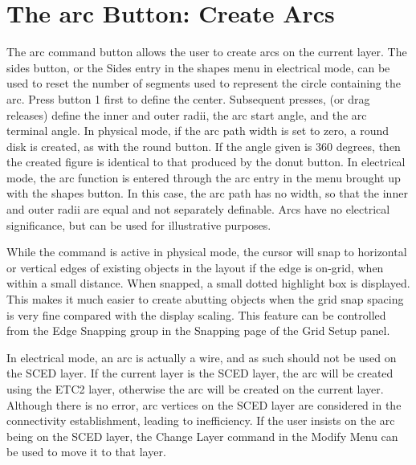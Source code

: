 \newpage

\section{The {\cb arc} Button: Create Arcs}

The {\cb arc} command button allows the user to create arcs on the
current layer.  The {\cb sides} button, or the {\cb Sides} entry in
the {\cb shapes} menu in electrical mode, can be used to reset the
number of segments used to represent the circle containing the arc. 
Press button 1 first to define the center.  Subsequent presses, (or
drag releases) define the inner and outer radii, the arc start angle,
and the arc terminal angle.  In physical mode, if the arc path width
is set to zero, a round disk is created, as with the {\cb round}
button.  If the angle given is 360 degrees, then the created figure is
identical to that produced by the {\cb donut} button.  In electrical
mode, the arc function is entered through the {\cb arc} entry in the
menu brought up with the {\cb shapes} button.  In this case, the arc
path has no width, so that the inner and outer radii are equal and not
separately definable.  Arcs have no electrical significance, but can
be used for illustrative purposes.

While the command is active in physical mode, the cursor will snap to
horizontal or vertical edges of existing objects in the layout if the
edge is on-grid, when within a small distance.  When snapped, a small
dotted highlight box is displayed.  This makes it much easier to
create abutting objects when the grid snap spacing is very fine
compared with the display scaling.  This feature can be controlled
from the {\cb Edge Snapping} group in the {\cb Snapping} page of the
{\cb Grid Setup} panel.

In electrical mode, an arc is actually a wire, and as such should not
be used on the SCED layer.  If the current layer is the SCED layer,
the arc will be created using the ETC2 layer, otherwise the arc will
be created on the current layer.  Although there is no error, arc
vertices on the SCED layer are considered in the connectivity
establishment, leading to inefficiency.  If the user insists on the
arc being on the SCED layer, the {\cb Change Layer} command in the
{\cb Modify Menu} can be used to move it to that layer.

